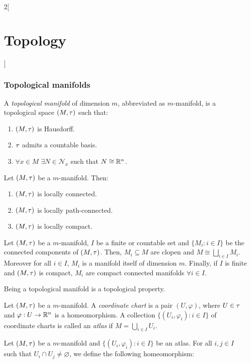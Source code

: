 \documentclass[../../../main_math.tex]{subfiles}
\begin{document}
\begin{multicols}{2}[\section{Topology}]
  \subsubsection{Topological manifolds}
  \begin{definition}
    A \emph{topological manifold} of dimension $m$, abbreviated as $m$-manifold, is a topological space $(M,\tau)$ such that:
    \begin{enumerate}
      \item $(M,\tau)$ is Hausdorff.
      \item $\tau$ admits a countable basis.
      \item $\forall x\in M$ $\exists N\in\mathcal{N}_x$ such that $N\cong\mathbb{R}^n$.
    \end{enumerate}
  \end{definition}
  \begin{proposition}
    Let $(M,\tau)$ be a $m$-manifold. Then:
    \begin{enumerate}
      \item $(M,\tau)$ is locally connected.
      \item $(M,\tau)$ is locally path-connected.
      \item $(M,\tau)$ is locally compact.
    \end{enumerate}
  \end{proposition}
  \begin{corollary}
    Let $(M,\tau)$ be a $m$-manifold, $I$ be a finite or countable set and $\{M_i:i\in I\}$ be the connected components of $(M,\tau)$. Then, $M_i\subseteq M$ are clopen and $M\cong\bigsqcup_{i\in I}M_i$. Moreover for all $i\in I$, $M_i$ is a manifold itself of dimension $m$. Finally, if $I$ is finite and $(M,\tau)$ is compact, $M_i$ are compact connected manifolds $\forall i\in I$.
  \end{corollary}
  \begin{proposition}
    Being a topological manifold is a topological property.
  \end{proposition}
  \begin{definition}
    Let $(M,\tau)$ be a $m$-manifold. A \emph{coordinate chart} is a pair $(U,\varphi)$, where $U\in\tau$ and $\varphi:U\rightarrow\mathbb{R}^n$ is a homeomorphism. A collection $\{(U_i,\varphi_i):i\in I\}$ of coordinate charts is called an \emph{atlas} if $M=\bigcup_{i\in I}U_i$.
  \end{definition}
  \begin{definition}
    Let $(M,\tau)$ be a $m$-manifold and $\{(U_i,\varphi_i):i\in I\}$ be an atlas. For all $i,j\in I$ such that $U_i\cap U_j\ne \varnothing$, we define the following homeomorphism: $$
$$
\end{definition}
\end{multicols}
\end{document}
